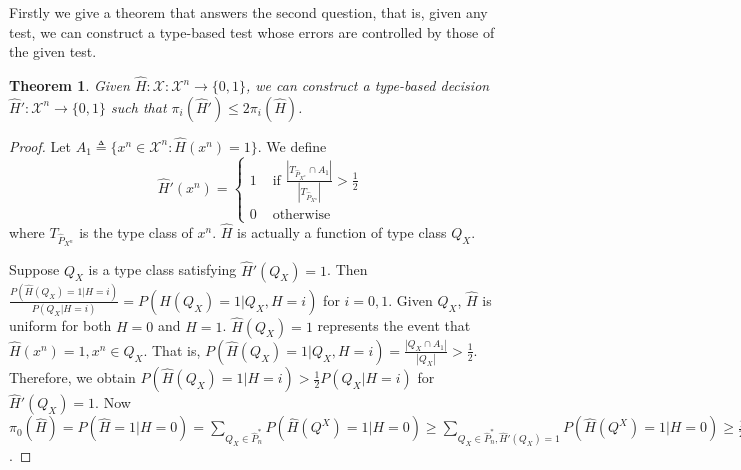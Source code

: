 \documentclass{article}
\newtheorem{theorem}{Theorem}
\begin{document}
 Firstly we give a theorem that answers the second question, that is, given any test, we can construct
 a type-based test whose errors are controlled by
 those of the given test.
\begin{theorem}\label{thm:type_based}
Given $\widehat{H}:
\mathcal{X}: \mathcal{X}^n \to \{0,1\}$, we can construct
a type-based decision $\widehat{H}':
\mathcal{X}^n \to \{0,1\}$ such that
$\pi_i(\widehat{H}') \leq 2\pi_i(\widehat{H}) $.
\end{theorem}
\begin{proof}
Let $A_1 \triangleq \{ x^n \in \mathcal{X}^n
: \widehat{H}(x^n) = 1 \}$. We define
\begin{equation*}
\widehat{H}'(x^n)
= \begin{cases}
1 & \textrm{ if }  \frac{|T_{\hat{P}_{X^n}} \cap A_1|}{|T_{\hat{P}_{X^n}}|} > \frac{1}{2}\\
0 & \textrm{ otherwise}
\end{cases}
\end{equation*}
where $T_{\hat{P}_{X^n}} $ is the type class of $x^n$. $\widehat{H}$ is actually a function of 
type class $Q_X$.

Suppose $Q_X$ is a type class satisfying $\widehat{H}'(Q_X)=1$.
Then $
\frac{P(\widehat{H}(Q_X)=1 | H=i)}{P(Q_X | H=i)}
= P(\widehat{H}(Q_X)=1 | Q_X, H = i)$ for $i=0,1$.
Given $Q_X$, $\widehat{H}$ is uniform for both $H=0$
and $H=1$. $\widehat{H}(Q_X)=1$ represents the event
that $\widehat{H}(x^n)=1, x^n \in Q_X$.
That is,
$P(\widehat{H}(Q_X)=1 | Q_X, H=i) = \frac{|Q_X \cap A_1|}{|Q_X|} > \frac{1}{2}$. Therefore,
we obtain $P(\widehat{H}(Q_X)=1|H=i) > \frac{1}{2}
P(Q_X|H=i)$ for $\widehat{H}'(Q_X)=1$.
Now $\pi_0(\widehat{H})=P(\widehat{H}=1|H=0)
=\sum_{Q_X \in \hat{P}_n^*}
P(\widehat{H}(Q^X)=1|H=0) \geq 
\sum_{Q_X \in \hat{P}_n^*, \widehat{H}'(Q_X)=1}
P(\widehat{H}(Q^X)=1|H=0)
\geq \frac{1}{2}
\sum_{Q_X \in \hat{P}_n^*, \widehat{H}'(Q_X)=1}
P(Q_X|H=0)=P(\widehat{H}'=1 | H=0)=\pi_0(\widehat{H}')
$.


\end{proof}
\end{document}
